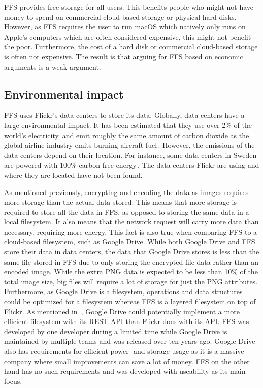 \gls{FFS} provides free storage for all users. This benefits people who might not have money to spend on commercial \mbox{cloud-based} storage or physical hard disks. However, as \gls{FFS} requires the user to run macOS which natively only runs on Apple's computers which are often considered expensive, this might not benefit the poor. Furthermore, the cost of a hard disk or commercial \mbox{cloud-based} storage is often not expensive. The result is that arguing for \gls{FFS} based on economic arguments is a weak argument.

\subsection{Environmental impact}
\label{subsec:imp_env}
\gls{FFS} uses Flickr's data centers to store its data. Globally, data centers have a large environmental impact. It has been estimated that they use over 2\% of the world's electricity\,\cite{mcleanDataCentersGenerate2020} and emit roughly the same amount of carbon dioxide as the global airline industry emits burning aircraft fuel\,\cite{pearceEnergyHogsCan}. However, the emissions of the data centers depend on their location. For instance, some data centers in Sweden are powered with 100\% carbon-free energy\,\cite{cappellaSwedenSustainableData2022,unfcccEcoDataCenterSwedenUNFCCC}. The data centers Flickr are using and where they are located have not been found.

As mentioned previously, encrypting and encoding the data as images requires more storage than the actual data stored. This means that more storage is required to store all the data in \gls{FFS}, as opposed to storing the same data in a local filesystem. It also means that the network request will carry more data than necessary, requiring more energy. This fact is also true when comparing \gls{FFS} to a \mbox{cloud-based} filesystem, such as Google Drive. While both Google Drive and \gls{FFS} store their data in data centers, the data that Google Drive stores is less than the same file stored in \gls{FFS} due to only storing the encrypted file data rather than an encoded image. While the extra PNG data is expected to be less than 10\% of the total image size, big files will require a lot of storage for just the PNG attributes. Furthermore, as Google Drive is a filesystem, operations and data structures could be optimized for a filesystem whereas \gls{FFS} is a layered filesystem on top of Flickr. As mentioned in~, Google Drive could potentially implement a more efficient filesystem with its REST \gls{API} than Flickr does with its \gls{API}. \gls{FFS} was developed by one developer during a limited time while Google Drive is maintained by multiple teams and was released over ten years ago. Google Drive also has requirements for efficient power- and storage usage as it is a massive company where small improvements can save a lot of money. \gls{FFS} on the other hand has no such requirements and was developed with useability as its main focus. 

